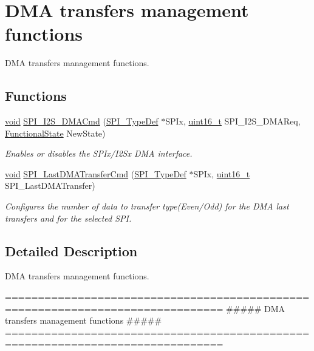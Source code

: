 \hypertarget{group___s_p_i___group4}{\section{D\-M\-A transfers management functions}
\label{group___s_p_i___group4}
}


D\-M\-A transfers management functions.  


\subsection*{Functions}
\begin{DoxyCompactItemize}
\item 
\hyperlink{group___n_a_m_e_ga18028b8badbf1ea7e704ccac3c488e82}{void} \hyperlink{group___s_p_i___group4_gabed5b91a8576e6d578f364cc0e807e4a}{S\-P\-I\-\_\-\-I2\-S\-\_\-\-D\-M\-A\-Cmd} (\hyperlink{struct_s_p_i___type_def}{S\-P\-I\-\_\-\-Type\-Def} $\ast$S\-P\-Ix, \hyperlink{stdint_8h_a273cf69d639a59973b6019625df33e30}{uint16\-\_\-t} S\-P\-I\-\_\-\-I2\-S\-\_\-\-D\-M\-A\-Req, \hyperlink{group___exported__types_gac9a7e9a35d2513ec15c3b537aaa4fba1}{Functional\-State} New\-State)
\begin{DoxyCompactList}\small\item\em Enables or disables the S\-P\-Ix/\-I2\-Sx D\-M\-A interface. \end{DoxyCompactList}\item 
\hyperlink{group___n_a_m_e_ga18028b8badbf1ea7e704ccac3c488e82}{void} \hyperlink{group___s_p_i___group4_gae0d690e9710b2bce73aae09c0e585122}{S\-P\-I\-\_\-\-Last\-D\-M\-A\-Transfer\-Cmd} (\hyperlink{struct_s_p_i___type_def}{S\-P\-I\-\_\-\-Type\-Def} $\ast$S\-P\-Ix, \hyperlink{stdint_8h_a273cf69d639a59973b6019625df33e30}{uint16\-\_\-t} S\-P\-I\-\_\-\-Last\-D\-M\-A\-Transfer)
\begin{DoxyCompactList}\small\item\em Configures the number of data to transfer type(Even/\-Odd) for the D\-M\-A last transfers and for the selected S\-P\-I. \end{DoxyCompactList}\end{DoxyCompactItemize}


\subsection{Detailed Description}
D\-M\-A transfers management functions. \begin{DoxyVerb} ===============================================================================
                  ##### DMA transfers management functions #####
 ===============================================================================\end{DoxyVerb}


